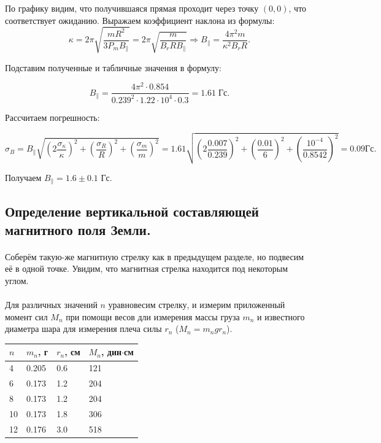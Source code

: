 \documentclass[a4paper,12pt]{article} %
\begin{document}
По графику видим, что получившаяся прямая проходит через точку $(0,0)$, что соответствует ожиданию. Выражаем коэффициент наклона из формулы:
\[ \kappa = 2 \pi \sqrt{\frac{m R^2}{3 P_m B_\parallel}} = 2\pi \sqrt{\frac{m}{B_r R B_\parallel}} \Rightarrow B_\parallel = \frac{4 \pi^2 m}{\kappa^2 B_r R}.
\]

Подставим полученные и табличные значения в формулу:

\[ B_\parallel = \frac{4 \pi^2 \cdot 0.854}{0.239^2 \cdot 1.22 \cdot 10^{4} \cdot 0.3} = 1.61 \; \text{Гс}.
\]

Рассчитаем погрешность:

\[ \sigma_B = B_\parallel  \sqrt{\left( 2 \frac{\sigma_\kappa}{\kappa} \right)^2 + \left(  \frac{\sigma_R}{R} \right)^2 + \left(  \frac{\sigma_m}{m} \right)^2} = 1.61 \sqrt{\left(2 \frac{0.007}{0.239} \right)^2 + \left(\frac{0.01}{6} \right)^2 + \left( \frac{10^{-4}}{0.8542} \right)^2} = 0.09 \text{Гс}.
\]

Получаем $B_\parallel = 1.6 \pm 0.1$ Гс.

\subsection{Определение вертикальной составляющей магнитного поля Земли.}

\paragraph{} Соберём такую-же магнитную стрелку как в предыдущем разделе, но подвесим её в одной точке. Увидим, что магнитная стрелка находится под некоторым углом.

\paragraph{} Для различных значений $n$ уравновесим стрелку, и измерим приложенный момент сил $M_n$ при помощи весов дли измерения массы груза $m_n$ и известного диаметра шара для измерения плеча силы $r_n$ ($M_n = m_n g r_n$).

\begin{table}[h]
\begin{center}
\begin{tabularx}{0.5\linewidth}{|l|X|X|X|}
\hline
$n$ & $m_n$, г & $r_n$, см & $M_n$, дин$\cdot$см \\ \hline
4 & 0.205 & 0.6 & 121 \\ \hline
6 & 0.173 & 1.2 & 204 \\ \hline
8 & 0.173 & 1.2 & 204 \\ \hline
10 & 0.173 & 1.8 & 306 \\ \hline
12 & 0.176 & 3.0 & 518 \\ \hline
\end{tabularx}
\end{center}
\end{table}
\end{document}
